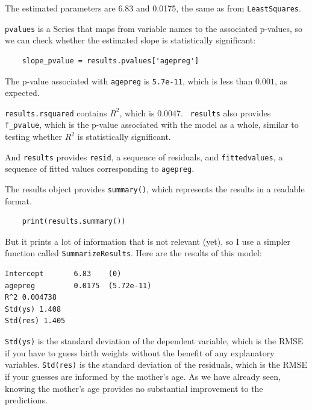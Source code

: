 \documentclass[12pt]{book}
\theoremstyle{exercise}
\begin{document}
The estimated parameters are 6.83 and 0.0175, the same as
from {\tt LeastSquares}.%

{\tt pvalues} is a Series that maps from variable names to the associated
p-values, so we can check whether the estimated slope is statistically
significant:%
%
%

\begin{verbatim}
    slope_pvalue = results.pvalues['agepreg']
\end{verbatim}

The p-value associated with {\tt agepreg} is {\tt 5.7e-11}, which
is less than $0.001$, as expected.%

{\tt results.rsquared} contains $R^2$, which is $0.0047$.  {\tt
  results} also provides \verb"f_pvalue", which is the p-value
associated with the model as a whole, similar to testing whether $R^2$
is statistically significant.%
%
%

And {\tt results} provides {\tt resid}, a sequence of residuals, and
{\tt fittedvalues}, a sequence of fitted values corresponding to
{\tt agepreg}.%

The results object provides {\tt summary()}, which
represents the results in a readable format.  

\begin{verbatim}
    print(results.summary())
\end{verbatim}

But it prints a lot of information that is not relevant (yet), so
I use a simpler function called {\tt SummarizeResults}.  Here are
the results of this model:

\begin{verbatim}
Intercept       6.83    (0)
agepreg         0.0175  (5.72e-11)
R^2 0.004738
Std(ys) 1.408
Std(res) 1.405
\end{verbatim}

{\tt Std(ys)} is the standard deviation of the dependent variable,
which is the RMSE if you have to guess birth weights without the benefit of
any explanatory variables.  {\tt Std(res)} is the standard deviation
of the residuals, which is the RMSE if your guesses are informed
by the mother's age.  As we have already seen, knowing the mother's
age provides no substantial improvement to the predictions.%
%
%
%
%
%
%
\end{document}
